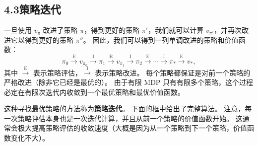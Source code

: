 \documentclass[UTF8,12pt,a4paper,fontset=fandol]{ctexart}
\begin{document}
\subsection*{4.3\quad 策略迭代}

一旦使用 $v_\pi$ 改进了策略 $\pi$，得到更好的策略 $\pi'$，我们就可以计算 $v_{\pi'}$，并再次改进它以得到更好的策略 $\pi''$。
因此，我们可以得到一列单调改进的策略和价值函数：
\[
\pi_0 \xrightarrow{\mathrm{E}} v_{\pi_0} \xrightarrow{\mathrm{I}} \pi_1
\xrightarrow{\mathrm{E}} v_{\pi_1} \xrightarrow{\mathrm{I}} \pi_2
\xrightarrow{\mathrm{E}} \cdots \xrightarrow{\mathrm{I}} \pi_*
\xrightarrow{\mathrm{E}} v_* ,
\]
其中 $\xrightarrow{\mathrm{E}}$ 表示策略评估，$\xrightarrow{\mathrm{I}}$ 表示策略改进。
每个策略都保证是对前一个策略的严格改进（除非它已经是最优的）。
由于有限 MDP 只有有限多个策略，这个过程必定在有限次迭代内收敛到一个最优策略和最优价值函数。

这种寻找最优策略的方法称为\textbf{策略迭代}。
下面的框中给出了完整算法。
注意，每一次策略评估本身也是一次迭代计算，并且从前一个策略的价值函数开始。
这通常会极大提高策略评估的收敛速度（大概是因为从一个策略到下一个策略，价值函数变化不大）。

\begin{center}
\end{center}
\end{document}
